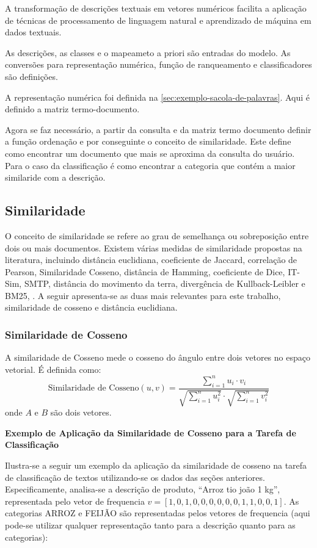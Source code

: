 A transformação de descrições textuais em vetores numéricos facilita a aplicação de técnicas de processamento de linguagem natural e aprendizado de máquina em dados textuais.



As descrições, as classes e o mapeameto a priori são entradas do modelo.  As conversões para representação numérica, função de ranqueamento e classificadores são definições.

A representação numérica foi definida na \ref{sec:exemplo-sacola-de-palavras}.  Aqui é definido a matriz termo-documento.

Agora se faz necessário, a partir da consulta e da matriz termo documento definir a função ordenação e por conseguinte o conceito de similaridade.  Este define como encontrar um documento que mais se aproxima da consulta do usuário.  Para o caso da classificação é como encontrar a categoria que contém a maior similaride com a descrição.


\subsection{Similaridade}

O conceito de similaridade se refere ao grau de semelhança ou sobreposição entre dois ou mais documentos. Existem várias medidas de similaridade propostas na literatura, incluindo distância euclidiana, coeficiente de Jaccard, correlação de Pearson, Similaridade Cosseno, distância de Hamming, coeficiente de Dice, IT-Sim, SMTP, distância do movimento da terra, divergência de Kullback-Leibler e BM25, \cite{deng2019feature}.  A seguir apresenta-se as duas mais relevantes para este trabalho, similaridade de cosseno e distância euclidiana.  

\subsubsection{Similaridade de Cosseno}
A similaridade de Cosseno mede o cosseno do ângulo entre dois vetores no espaço vetorial. É definida como:
\begin{equation}
    \text{Similaridade de Cosseno}(u,v) = \frac{\sum_{i=1}^{n} u_i \cdot v_i}{\sqrt{\sum_{i=1}^{n} u_i^2} \cdot \sqrt{\sum_{i=1}^{n} v_i^2}}
\end{equation}
onde $A$ e $B$ são dois vetores.

\textbf{Exemplo de Aplicação da Similaridade de Cosseno para a Tarefa de Classificação}

Ilustra-se a seguir um exemplo da aplicação da similaridade de cosseno na tarefa de classificação de textos utilizando-se os dados das seções anteriores. Especificamente, analisa-se a descrição de produto, ``Arroz tio joão 1 kg'', representada pelo vetor de frequencia \(v = [1,0,1,0,0,0,0,0,0,1,1,0,0,1]\). As categorias ARROZ e FEIJÃO são representadas pelos vetores de frequencia (aqui pode-se utilizar qualquer representação tanto para a descrição quanto para as categorias):

